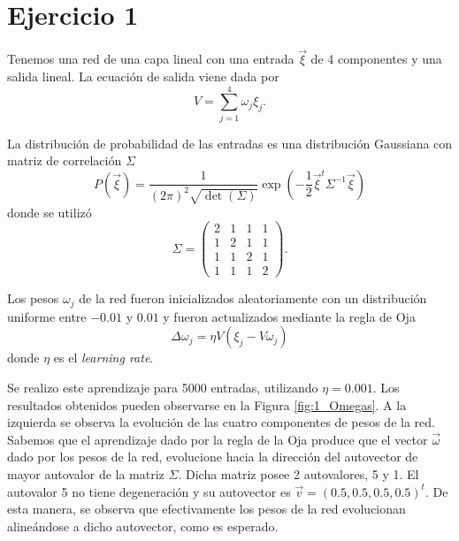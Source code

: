 \section*{Ejercicio 1}
\graphicspath{{/home/cabre/Desktop/Redes_Neuronales/Redes_Neuronales_IB/Practica_5/Figuras}}

Tenemos una red de una capa lineal con una entrada $\vec{\xi}$ de 4 componentes y una salida lineal. La ecuación de salida viene dada por
\begin{equation}
    V = \sum_{j=1}^{4} \omega_{j}\xi_{j}.
\end{equation}

La distribución de probabilidad de las entradas es una distribución Gaussiana con matriz de correlación $\Sigma$
\begin{equation}
    P \left( \vec{\xi} \right) =
    \frac{1}{\left( 2\pi \right)^{2} \sqrt{\det \left( \Sigma \right)} }
    \exp \left( -\frac{1}{2} \vec{\xi}^{t} \Sigma^{-1} \vec{\xi} \right) 
\end{equation}
donde se utilizó
\begin{equation}
    \Sigma = 
    \begin{pmatrix}
        2 &	1 & 1 & 1 \\
        1 &	2 & 1 & 1 \\
        1 &	1 & 2 & 1 \\
        1 &	1 & 1 & 2 
    \end{pmatrix}.
\end{equation}

Los pesos $\omega_{j}$ de la red fueron inicializados aleatoriamente con un distribución uniforme entre $-0.01$ y $0.01$ y fueron actualizados mediante la regla de Oja
\begin{equation}
	\Delta \omega_{j} = \eta V \left( \xi_{j} - V \omega_{j} \right)
\end{equation}
donde $\eta$ es el \textit{learning rate}.

Se realizo este aprendizaje para 5000 entradas, utilizando $\eta = 0.001$. Los resultados obtenidos pueden observarse en la Figura \ref{fig:1_Omegas}. A la izquierda se observa la evolución de las cuatro componentes de pesos de la red. Sabemos que el aprendizaje dado por la regla de la Oja produce que el vector $\vec{\omega}$ dado por los pesos de la red, evolucione hacia la dirección del autovector de mayor autovalor de la matriz $\Sigma$. Dicha matriz posee 2 autovalores, 5 y 1. El autovalor 5 no tiene degeneración y su autovector es $\vec{v} = \left(0.5, 0.5, 0.5, 0.5\right)^{t}$. De esta manera, se observa que efectivamente los pesos de la red evolucionan alineándose a dicho autovector, como es esperado.

